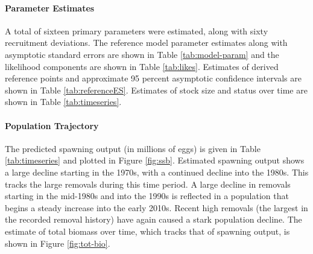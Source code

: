 \documentclass[11pt,
  english,
  a4paper,
]{article}
\begin{document}

\hypertarget{parameter-estimates}{%
\paragraph{Parameter Estimates}\label{parameter-estimates}}

\leavevmode\tagmcend\tagstructend


A total of sixteen primary parameters were estimated, along with sixty recruitment deviations. The reference model parameter estimates along with asymptotic standard errors are shown in Table \ref{tab:model-param} and the likelihood components are shown in Table \ref{tab:likes}. Estimates of derived reference points and approximate 95 percent asymptotic confidence intervals are shown in Table \ref{tab:referenceES}. Estimates of stock size and status over time are shown in Table \ref{tab:timeseries}.

\leavevmode\tagmcend\tagstructend\par


\hypertarget{population-trajectory}{%
\paragraph{Population Trajectory}\label{population-trajectory}}

\leavevmode\tagmcend\tagstructend


The predicted spawning output (in millions of eggs) is given in Table \ref{tab:timeseries} and plotted in Figure \ref{fig:ssb}. Estimated spawning output shows a large decline starting in the 1970s, with a continued decline into the 1980s. This tracks the large removals during this time period. A large decline in removals starting in the mid-1980s and into the 1990s is reflected in a population that begins a steady increase into the early 2010s. Recent high removals (the largest in the recorded removal history) have again caused a stark population decline. The estimate of total biomass over time, which tracks that of spawning output, is shown in Figure \ref{fig:tot-bio}.

\leavevmode\tagmcend\tagstructend\par

\end{document}
